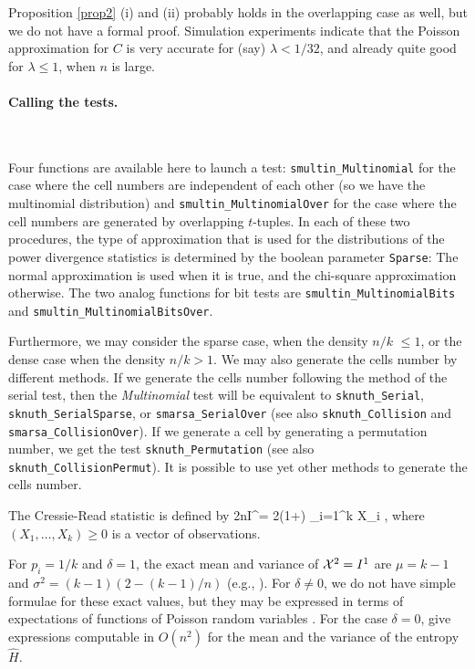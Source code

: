 Proposition \ref{prop2} (i) and (ii) probably holds in the overlapping
case as well, but we do not have a formal proof.
Simulation experiments indicate that the Poisson approximation
for $C$ is very accurate for (say) $\lambda < 1/32$, and already
quite good for $\lambda\le 1$, when $n$ is large.

\paragraph*{Calling the tests.} \

Four functions are available here to launch a test:
{\tt smultin\_Multinomial} for the case where the cell numbers are
independent of each other (so we have the multinomial distribution)
and {\tt smultin\_MultinomialOver} for the case where the cell numbers
are generated by overlapping $t$-tuples.
In each of these two procedures, the type of approximation that is used
for the distributions of the power divergence statistics is determined
by the boolean parameter {\tt Sparse}: The normal approximation is used
when it is true, and the chi-square approximation otherwise. The
two analog functions for bit tests are {\tt smultin\_MultinomialBits} and
{\tt smultin\_MultinomialBitsOver}.


\iffalse  %

Furthermore, we may consider the sparse  case, when the density
 $n/k$ $\le  1$,  or the dense case when the density $n/k > 1$.
 We may also generate the  cells number by different methods.
 If we generate the cells number following the method of the serial test,
 then the {\sl Multinomial} test will be equivalent to
 {\tt sknuth\_Serial}, {\tt sknuth\_SerialSparse}, or {\tt smarsa\_SerialOver}
 (see also {\tt sknuth\_Collision} and  {\tt smarsa\_CollisionOver}).
 If we generate a cell by generating a permutation number, we get the
 test {\tt sknuth\_Permutation} (see also {\tt sknuth\_CollisionPermut}).
 It is possible to use yet other methods to generate the cells number.

The  Cressie-Read statistic \cite{tREA88a} is  defined by
\eq
  2nI^\delta = {2\over \delta(1+\delta)} \sum_{i=1}^k
              X_i ,
\endeq
 where $(X_1,\dots,X_k) \ge 0$ is a vector of observations.

For $p_i = 1/k$ and $\delta = 1$, the exact mean and variance
of ${\cal X}^2 = I^1$ are $\mu = k-1$ and $\sigma^2 = (k-1)(2 - (k-1)/n)$
(e.g., \cite{tHAL37a,tKOE80a}).  %
For $\delta \not= 0$, we do not have  simple formulae for
these exact values, but they may be  expressed in terms of expectations
of functions of Poisson random variables \cite{tKOE80a,tREA88a}.
For the case $\delta = 0$, \cite{rLEC96e} give expressions
 computable in $O(n^2)$ for the mean and the variance of
the entropy $\hat H$.

